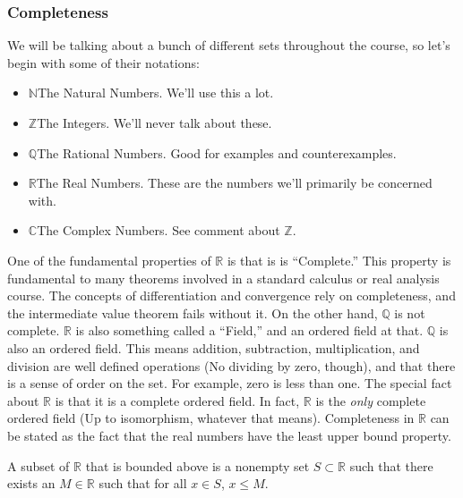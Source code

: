 \documentclass[crop=false,class=article,oneside]{standalone}
\begin{document}
        \subsubsection{Completeness}
            We will be talking about a bunch of different sets
            throughout the course, so let's begin with some of
            their notations:
            \begin{itemize}
                \item $\mathbb{N}$\quad The Natural Numbers.
                      We'll use this a lot.
                \item $\mathbb{Z}$\quad The Integers.
                      We'll never talk about these.
                \item $\mathbb{Q}$\quad The Rational Numbers.
                      Good for examples and counterexamples.
                \item $\mathbb{R}$\quad The Real Numbers.
                      These are the numbers we'll primarily
                      be concerned with.
                \item $\mathbb{C}$\quad The Complex Numbers.
                      See comment about $\mathbb{Z}$.
            \end{itemize}
            One of the fundamental properties of $\mathbb{R}$ is
            that is is ``Complete.'' This property is fundamental
            to many theorems involved in a standard calculus or
            real analysis course. The concepts of differentiation
            and convergence rely on completeness, and the
            intermediate value theorem fails without it. On the
            other hand, $\mathbb{Q}$ is not complete. $\mathbb{R}$
            is also something called a ``Field,'' and an ordered
            field at that. $\mathbb{Q}$ is also an ordered field.
            This means addition, subtraction, multiplication, and
            division are well defined operations (No dividing by
            zero, though), and that there is a sense of order on
            the set. For example, zero is less than one. The
            special fact about $\mathbb{R}$ is that it is a
            complete ordered field. In fact, $\mathbb{R}$ is the
            \textit{only} complete ordered field (Up to isomorphism,
            whatever that means). Completeness in $\mathbb{R}$ can
            be stated as the fact that the real numbers have the
            least upper bound property.
            \begin{definition}
                A subset of $\mathbb{R}$ that is bounded above is
                a nonempty set $S\subset{\mathbb{R}}$ such that
                there exists an $M\in\mathbb{R}$ such that for all
                $x\in{S}$, $x\leq{M}$.
            \end{definition}
\end{document}
